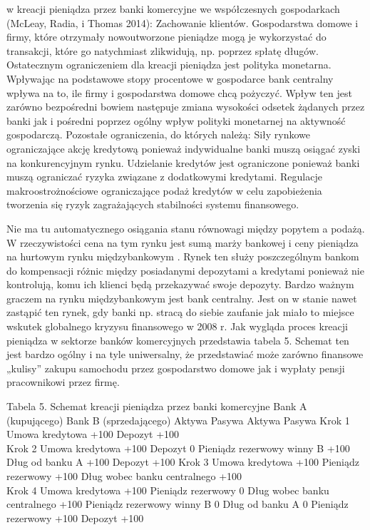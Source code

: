 \documentclass[
]{book}
\begin{document}
w kreacji pieniądza przez banki komercyjne we współczesnych gospodarkach (McLeay, Radia, i Thomas 2014): Zachowanie klientów. Gospodarstwa domowe i firmy, które otrzymały nowoutworzone pieniądze mogą je wykorzystać do transakcji, które go natychmiast zlikwidują, np. poprzez spłatę długów. Ostatecznym ograniczeniem dla kreacji pieniądza jest polityka monetarna. Wpływając na podstawowe stopy procentowe w gospodarce bank centralny wpływa na to, ile firmy i gospodarstwa domowe chcą pożyczyć. Wpływ ten jest zarówno bezpośredni bowiem następuje zmiana wysokości odsetek żądanych przez banki jak i pośredni poprzez ogólny wpływ polityki monetarnej na aktywność gospodarczą. Pozostałe ograniczenia, do których należą: Siły rynkowe ograniczające akcję kredytową ponieważ indywidualne banki muszą osiągać zyski na konkurencyjnym rynku. Udzielanie kredytów jest ograniczone ponieważ banki muszą ograniczać ryzyka związane z dodatkowymi kredytami. Regulacje makroostrożnościowe ograniczające podaż kredytów w celu zapobieżenia tworzenia się ryzyk zagrażających stabilności systemu finansowego.

Nie ma tu automatycznego osiągania stanu równowagi między popytem a podażą. W rzeczywistości cena na tym rynku jest sumą marży bankowej i ceny pieniądza na hurtowym rynku międzybankowym . Rynek ten służy poszczególnym bankom do kompensacji różnic między posiadanymi depozytami a kredytami ponieważ nie kontrolują, komu ich klienci będą przekazywać swoje depozyty. Bardzo ważnym graczem na rynku międzybankowym jest bank centralny. Jest on w stanie nawet zastąpić ten rynek, gdy banki np. stracą do siebie zaufanie jak miało to miejsce wskutek globalnego kryzysu finansowego w 2008 r. Jak wygląda proces kreacji pieniądza w sektorze banków komercyjnych przedstawia tabela 5. Schemat ten jest bardzo ogólny i na tyle uniwersalny, że przedstawiać może zarówno finansowe „kulisy'' zakupu samochodu przez gospodarstwo domowe jak i wypłaty pensji pracownikowi przez firmę.

Tabela 5. Schemat kreacji pieniądza przez banki komercyjne Bank A (kupującego) Bank B (sprzedającego) Aktywa Pasywa Aktywa Pasywa Krok 1 Umowa kredytowa +100 Depozyt +100\\
Krok 2 Umowa kredytowa +100 Depozyt 0 Pieniądz rezerwowy winny B +100 Dług od banku A +100 Depozyt +100 Krok 3 Umowa kredytowa +100 Pieniądz rezerwowy +100 Dług wobec banku centralnego +100\\
Krok 4 Umowa kredytowa +100 Pieniądz rezerwowy 0 Dług wobec banku centralnego +100 Pieniądz rezerwowy winny B 0 Dług od banku A 0 Pieniądz rezerwowy +100 Depozyt +100
\end{document}
